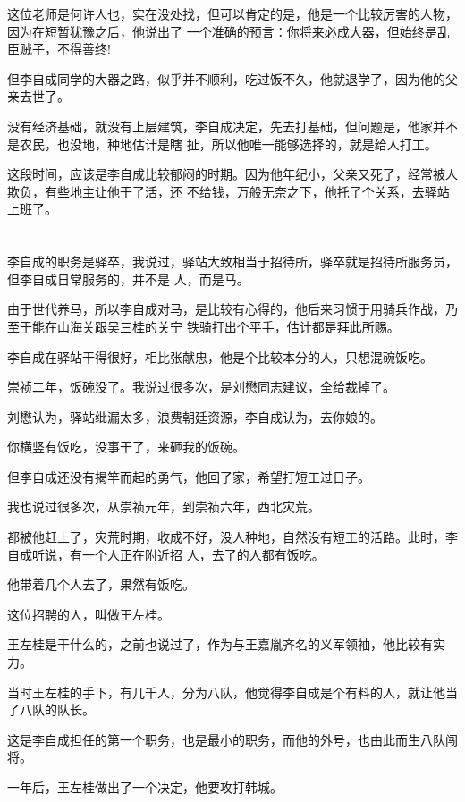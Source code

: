 \documentclass[11pt,a4paper,onecolumn]{article}
\begin{document}
这位老师是何许人也，实在没处找，但可以肯定的是，他是一个比较厉害的人物，因为在短暂犹豫之后，他说出了
一个准确的预言：你将来必成大器，但始终是乱臣贼子，不得善终!

但李自成同学的大器之路，似乎并不顺利，吃过饭不久，他就退学了，因为他的父亲去世了。

没有经济基础，就没有上层建筑，李自成决定，先去打基础，但问题是，他家并不是农民，也没地，种地估计是瞎
扯，所以他唯一能够选择的，就是给人打工。

这段时间，应该是李自成比较郁闷的时期。因为他年纪小，父亲又死了，经常被人欺负，有些地主让他干了活，还
不给钱，万般无奈之下，他托了个关系，去驿站上班了。

\section[\thesection]{}

李自成的职务是驿卒，我说过，驿站大致相当于招待所，驿卒就是招待所服务员，但李自成日常服务的，并不是
人，而是马。

由于世代养马，所以李自成对马，是比较有心得的，他后来习惯于用骑兵作战，乃至于能在山海关跟吴三桂的关宁
铁骑打出个平手，估计都是拜此所赐。

李自成在驿站干得很好，相比张献忠，他是个比较本分的人，只想混碗饭吃。

崇祯二年，饭碗没了。我说过很多次，是刘懋同志建议，全给裁掉了。

刘懋认为，驿站纰漏太多，浪费朝廷资源，李自成认为，去你娘的。

你横竖有饭吃，没事干了，来砸我的饭碗。

但李自成还没有揭竿而起的勇气，他回了家，希望打短工过日子。

我也说过很多次，从崇祯元年，到崇祯六年，西北灾荒。

都被他赶上了，灾荒时期，收成不好，没人种地，自然没有短工的活路。此时，李自成听说，有一个人正在附近招
人，去了的人都有饭吃。

他带着几个人去了，果然有饭吃。

这位招聘的人，叫做王左桂。

王左桂是干什么的，之前也说过了，作为与王嘉胤齐名的义军领袖，他比较有实力。

当时王左桂的手下，有几千人，分为八队，他觉得李自成是个有料的人，就让他当了八队的队长。

这是李自成担任的第一个职务，也是最小的职务，而他的外号，也由此而生\myrule 八队闯将。

一年后，王左桂做出了一个决定，他要攻打韩城。
\end{document}
